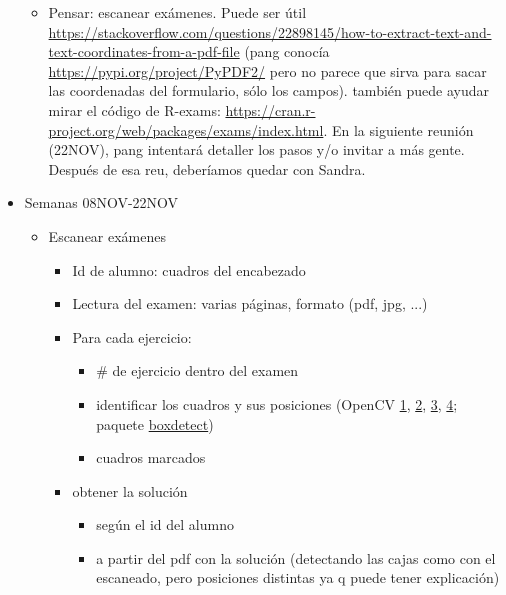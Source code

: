 \begin{itemize}
\begin{itemize}
        \item Pensar: escanear exámenes. Puede ser útil \url{https://stackoverflow.com/questions/22898145/how-to-extract-text-and-text-coordinates-from-a-pdf-file} (pang conocía \url{https://pypi.org/project/PyPDF2/} pero no parece que sirva para sacar las coordenadas del formulario, sólo los campos). también puede ayudar mirar el código de R-exams: \url{https://cran.r-project.org/web/packages/exams/index.html}. En la siguiente reunión (22NOV), pang intentará detaller los pasos y/o invitar a más gente. Después de esa reu, deberíamos quedar con Sandra.
    \end{itemize}
    \item Semanas 08NOV-22NOV
    \begin{itemize}
        \item Escanear exámenes
        \begin{itemize}
            \item Id de alumno: cuadros del encabezado
            \item Lectura del examen: varias páginas, formato (pdf, jpg, ...)
            \item Para cada ejercicio:
            \begin{itemize}
                \item \# de ejercicio dentro del examen
                \item identificar los cuadros y sus posiciones (OpenCV 
                \href{https://towardsdatascience.com/checkbox-table-cell-detection-using-opencv-python-332c57d25171}{1}, 
                \href{https://stackoverflow.com/questions/55763858/how-to-detect-and-find-checkboxes-in-a-form-using-python-opencv}{2}, 
                \href{https://www.fuzzylabs.ai/blog-post/checkbox-detection-with-opencv}{3}, 
                \href{https://loichau997.medium.com/apply-computer-vision-on-the-questionaire-image-to-detect-ticked-checkboxes-646e9245d293}{4}; 
                paquete \href{https://pypi.org/project/boxdetect/}{boxdetect})
                \item cuadros marcados
            \end{itemize}
            \item obtener la solución
            \begin{itemize}
                \item según el id del alumno
                \item a partir del pdf con la solución (detectando las cajas como con el escaneado, pero posiciones distintas ya q puede tener explicación)

\end{itemize}
\end{itemize}
\end{itemize}
\end{itemize}

